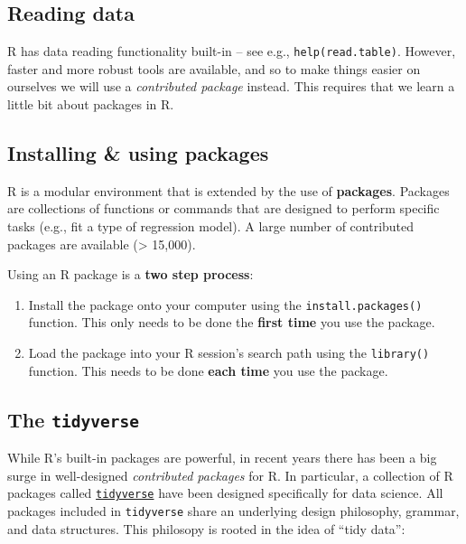 \documentclass[
]{book}
\begin{document}
\hypertarget{reading-data}{%
\subsection{Reading data}\label{reading-data}}

R has data reading functionality built-in -- see e.g.,
\texttt{help(read.table)}. However, faster and more robust tools are
available, and so to make things easier on ourselves we will use a
\emph{contributed package} instead. This requires that we
learn a little bit about packages in R.

\hypertarget{installing-using-packages}{%
\subsection{Installing \& using packages}\label{installing-using-packages}}

R is a modular environment that is extended by the use of \textbf{packages}.
Packages are collections of functions or commands that are designed to
perform specific tasks (e.g., fit a type of regression model). A large
number of contributed packages are available (\textgreater{} 15,000).

Using an R package is a \textbf{two step process}:

\begin{enumerate}
\def\labelenumi{\arabic{enumi}.}
\item
  Install the package onto your computer using the
  \texttt{install.packages()} function. This only needs to
  be done the \textbf{first time} you use the package.
\item
  Load the package into your R session's search path
  using the \texttt{library()} function. This needs to be done
  \textbf{each time} you use the package.
\end{enumerate}

\hypertarget{the-tidyverse}{%
\subsection{\texorpdfstring{The \texttt{tidyverse}}{The tidyverse}}\label{the-tidyverse}}

While R's built-in packages are powerful, in recent years there has
been a big surge in well-designed \emph{contributed packages} for R. In
particular, a collection of R packages called
\href{https://www.tidyverse.org/}{\texttt{tidyverse}} have been
designed specifically for data science. All packages included in
\texttt{tidyverse} share an underlying design philosophy, grammar, and
data structures. This philosopy is rooted in the idea of ``tidy data'':
\end{document}
